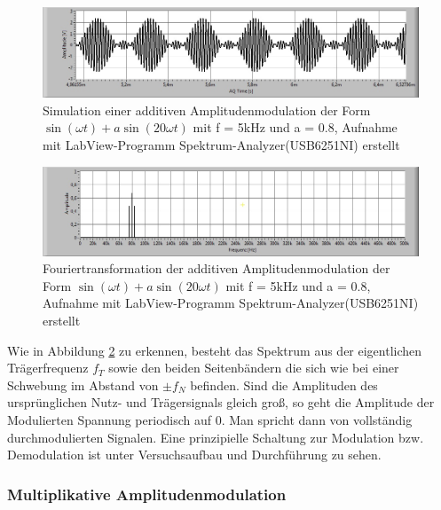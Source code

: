 		\begin{figure}[H]
			\center	
			\includegraphics[scale = 0.45]{messwerte/AM_addit.jpg}	
			\caption{\centering Simulation einer additiven Amplitudenmodulation der Form $\sin (\omega t) + a \sin (20 \omega t)$ mit f = 5kHz und a = 0.8, Aufnahme mit LabView-Programm Spektrum-Analyzer(USB6251NI) erstellt} %
			\label{AM_addit}
		\end{figure}

		\begin{figure}[H]	
			\center	
			\includegraphics[scale = 0.45]{messwerte/FT_AM_addit.jpg}	
			\caption{\centering Fouriertransformation der additiven Amplitudenmodulation der Form $\sin (\omega t) + a \sin (20 \omega t)$ mit f = 5kHz und a = 0.8, Aufnahme mit LabView-Programm Spektrum-Analyzer(USB6251NI) erstellt} %
			\label{FT_AM_addit}	
		\end{figure}

		Wie in Abbildung \ref{FT_AM_addit} zu erkennen, besteht das Spektrum aus der eigentlichen Trägerfrequenz $f_T$ sowie den beiden Seitenbändern die sich wie bei einer Schwebung im Abstand von $\pm f_N$ befinden. 
		Sind die Amplituden des ursprünglichen Nutz- und Trägersignals gleich groß, so geht die Amplitude der Modulierten Spannung periodisch auf 0. 
		Man spricht dann von vollständig durchmodulierten Signalen. 
		Eine prinzipielle Schaltung zur Modulation bzw. Demodulation ist unter Versuchsaufbau und Durchführung zu sehen. \cite{unterlagen}


	\subsubsection{Multiplikative Amplitudenmodulation} %
	\label{ssub:multiplikative_amplitudenmodulation}
	
